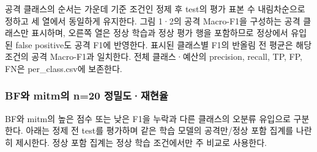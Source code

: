 공격 클래스의 순서는 가운데 기준 조건인 정제 후 test의 평가 표본 수 내림차순으로 정하고 세 열에서 동일하게 유지한다. 그림 1·2의 공격 Macro-F1을 구성하는 공격 클래스만 표시하며, 오른쪽 열은 정상 학습과 정상 평가 행을 포함하므로 정상에서 유입된 false positive도 공격 F1에 반영한다. 표시된 클래스별 F1의 반올림 전 평균은 해당 조건의 공격 Macro-F1과 일치한다. 전체 클래스·예산의 precision, recall, TP, FP, FN은 per\_\allowbreak{}class.csv에 보존한다.






\subsubsection{BF와 mitm의 n=\allowbreak{}20 정밀도·재현율}
BF와 mitm의 높은 점수 또는 낮은 F1을 누락과 다른 클래스의 오분류 유입으로 구분한다. 아래는 정제 전 test를 평가하며 같은 학습 모델의 공격만/\allowbreak{}정상 포함 집계를 나란히 제시한다. 정상 포함 집계는 정상 학습 조건에서만 주 비교로 사용한다.

